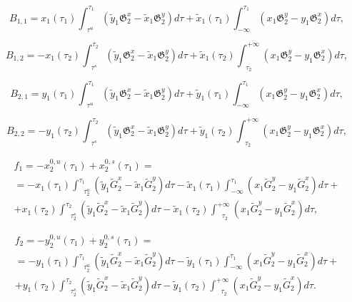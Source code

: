 $$B_{1,1} = x_1(\tau_1)\int_{\text{ } \tau^u}^{\tau_1} \left( \tilde y_1 \mathfrak{G}_2^x - \tilde x_1 \mathfrak{G}_2^y \right) d \tau + 
        \tilde x_1(\tau_1) \int_{-\infty}^{\tau_1} \left( x_1 \mathfrak{G}_2^y - y_1 \mathfrak{G}_2^x \right) d \tau,$$

$$B_{1,2} = - x_1(\tau_2)\int_{\text{ } \tau^s}^{\tau_2} \left( \tilde y_1 \mathfrak{G}_2^x - \tilde x_1 \mathfrak{G}_2^y \right) d \tau + 
        \tilde x_1(\tau_2) \int_{\text{ } \tau_2}^{+\infty} \left( x_1 \mathfrak{G}_2^y - y_1 \mathfrak{G}_2^x \right) d \tau,$$

$$B_{2,1} = y_1(\tau_1)\int_{\text{ } \tau^u}^{\tau_1} \left( \tilde y_1 \mathfrak{G}_2^x - \tilde x_1 \mathfrak{G}_2^y \right) d \tau + 
        \tilde y_1(\tau_1) \int_{-\infty}^{\tau_1} \left( x_1 \mathfrak{G}_2^y - y_1 \mathfrak{G}_2^x \right) d \tau,$$
        
$$B_{2,2} = -y_1(\tau_2)\int_{\text{ } \tau^s}^{\tau_2} \left( \tilde y_1 \mathfrak{G}_2^x - \tilde x_1 \mathfrak{G}_2^y \right) d \tau + 
        \tilde y_1(\tau_2) \int_{\text{ } \tau_2}^{+\infty} \left( x_1 \mathfrak{G}_2^y - y_1 \mathfrak{G}_2^x \right) d \tau,$$
     
\begin{multline*}
f_1 = - x_2^{0,u}(\tau_1) + x_2^{0,s}(\tau_1) = \\
= - x_1(\tau_1)\int_{\text{ } \tau_2^u}^{\tau_1} \left( \tilde y_1 \tilde{G}_2^x - \tilde x_1 \tilde{G}_2^y \right) d \tau - 
        \tilde x_1(\tau_1) \int_{-\infty}^{\tau_1} \left( x_1 \tilde{G}_2^y - y_1 \tilde{G}_2^x \right) d \tau + \\
  + x_1(\tau_2)\int_{\text{ } \tau_2^s}^{\tau_2} \left( \tilde y_1 \tilde{G}_2^x - \tilde x_1 \tilde{G}_2^y \right) d \tau - 
        \tilde x_1(\tau_2) \int_{\text{ } \tau_2}^{+\infty} \left( x_1 \tilde{G}_2^y - y_1 \tilde{G}_2^x \right) d \tau,
\end{multline*}     

\begin{multline*}
f_2 = - y_2^{0,u}(\tau_1) + y_2^{0,s}(\tau_1) = \\
= - y_1(\tau_1)\int_{\text{ } \tau_2^u}^{\tau_1} \left( \tilde y_1 \tilde{G}_2^x - \tilde x_1 \tilde{G}_2^y \right) d \tau - 
        \tilde y_1(\tau_1) \int_{-\infty}^{\tau_1} \left( x_1 \tilde{G}_2^y - y_1 \tilde{G}_2^x \right) d \tau + \\
  + y_1(\tau_2)\int_{\text{ } \tau_2^s}^{\tau_2} \left( \tilde y_1 \tilde{G}_2^x - \tilde x_1 \tilde{G}_2^y \right) d \tau - 
        \tilde y_1(\tau_2) \int_{\text{ } \tau_2}^{+\infty} \left( x_1 \tilde{G}_2^y - y_1 \tilde{G}_2^x \right) d \tau.
\end{multline*}     

